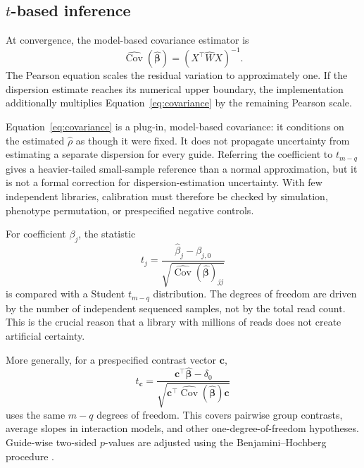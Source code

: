 \subsection{\texorpdfstring{$t$-based inference}{t-based inference}}

At convergence, the model-based covariance estimator is
\begin{equation}
  \widehat{\operatorname{Cov}}
  (\widehat{\boldsymbol{\beta}})
  =(X^\top\widehat{W}X)^{-1}.
  \label{eq:covariance}
\end{equation}
The Pearson equation scales the residual variation to approximately one.  If
the dispersion estimate reaches its numerical upper boundary, the
implementation additionally multiplies Equation~\eqref{eq:covariance} by the
remaining Pearson scale.

Equation~\eqref{eq:covariance} is a plug-in, model-based covariance: it
conditions on the estimated $\widehat{\rho}$ as though it were fixed.  It does
not propagate uncertainty from estimating a separate dispersion for every
guide.  Referring the coefficient to $t_{m-q}$ gives a heavier-tailed
small-sample reference than a normal approximation, but it is not a formal
correction for dispersion-estimation uncertainty.  With few independent
libraries, calibration must therefore be checked by simulation, phenotype
permutation, or prespecified negative controls.

For coefficient $\beta_j$, the statistic
\begin{equation}
  t_j =
  \frac{\widehat{\beta}_j-\beta_{j,0}}
  {\sqrt{
  \widehat{\operatorname{Cov}}
  (\widehat{\boldsymbol{\beta}})_{jj}}}
  \label{eq:tstat}
\end{equation}
is compared with a Student $t_{m-q}$ distribution.  The degrees of freedom are
driven by the number of independent sequenced samples, not by the total read
count.  This is the crucial reason that a library with millions of reads does
not create artificial certainty.

More generally, for a prespecified contrast vector $\mathbf{c}$,
\begin{equation}
  t_{\mathbf{c}} =
  \frac{\mathbf{c}^\top\widehat{\boldsymbol{\beta}}-\delta_0}
  {\sqrt{\mathbf{c}^\top
  \widehat{\operatorname{Cov}}(\widehat{\boldsymbol{\beta}})
  \mathbf{c}}}
\end{equation}
uses the same $m-q$ degrees of freedom.  This covers pairwise group contrasts,
average slopes in interaction models, and other one-degree-of-freedom
hypotheses.  Guide-wise two-sided $p$-values are adjusted using the
Benjamini--Hochberg procedure \citep{benjamini1995controlling}.

